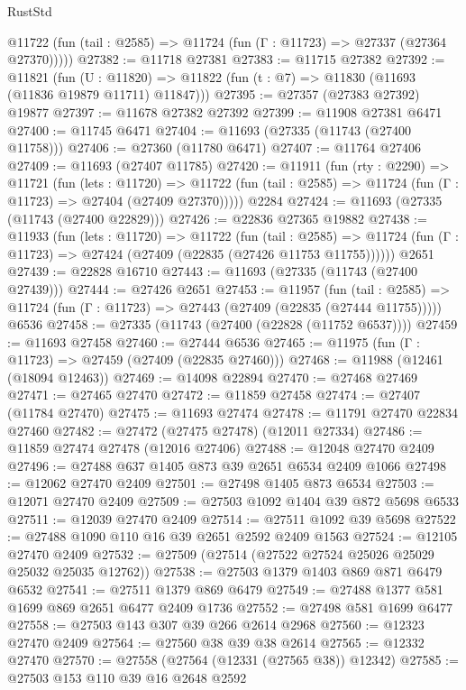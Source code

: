 \begin{lexlean}{RustStd}
\begin{coremodule}
      @11722 (fun (tail : @2585) => @11724 (fun (Γ : @11723) => @27337 (@27364 @27370)))))
@27382 := @11718 @27381
@27383 := @11715 @27382
@27392 := @11821
    (fun (U : @11820) => @11822 (fun (t : @7) => @11830 (@11693 (@11836 @19879 @11711) @11847)))
@27395 := @27357 (@27383 @27392) @19877
@27397 := @11678 @27382 @27392
@27399 := @11908 @27381 @6471
@27400 := @11745 @6471
@27404 := @11693 (@27335 (@11743 (@27400 @11758)))
@27406 := @27360 (@11780 @6471)
@27407 := @11764 @27406
@27409 := @11693 (@27407 @11785)
@27420 := @11911
    (fun (rty : @2290) =>
    @11721
      (fun (lets : @11720) =>
      @11722 (fun (tail : @2585) => @11724 (fun (Γ : @11723) => @27404 (@27409 @27370)))))
    @2284
@27424 := @11693 (@27335 (@11743 (@27400 @22829)))
@27426 := @22836 @27365 @19882
@27438 := @11933
    (fun (lets : @11720) =>
    @11722
      (fun (tail : @2585) =>
      @11724 (fun (Γ : @11723) => @27424 (@27409 (@22835 (@27426 @11753 @11755))))))
    @2651
@27439 := @22828 @16710
@27443 := @11693 (@27335 (@11743 (@27400 @27439)))
@27444 := @27426 @2651
@27453 := @11957
    (fun (tail : @2585) => @11724 (fun (Γ : @11723) => @27443 (@27409 (@22835 (@27444 @11755)))))
    @6536
@27458 := @27335 (@11743 (@27400 (@22828 (@11752 @6537))))
@27459 := @11693 @27458
@27460 := @27444 @6536
@27465 := @11975 (fun (Γ : @11723) => @27459 (@27409 (@22835 @27460)))
@27468 := @11988 (@12461 (@18094 @12463))
@27469 := @14098 @22894
@27470 := @27468 @27469
@27471 := @27465 @27470
@27472 := @11859 @27458
@27474 := @27407 (@11784 @27470)
@27475 := @11693 @27474
@27478 := @11791 @27470 @22834 @27460
@27482 := @27472 (@27475 @27478) (@12011 @27334)
@27486 := @11859 @27474 @27478 (@12016 @27406)
@27488 := @12048 @27470 @2409
@27496 := @27488 @637 @1405 @873 @39 @2651 @6534 @2409 @1066
@27498 := @12062 @27470 @2409
@27501 := @27498 @1405 @873 @6534
@27503 := @12071 @27470 @2409
@27509 := @27503 @1092 @1404 @39 @872 @5698 @6533
@27511 := @12039 @27470 @2409
@27514 := @27511 @1092 @39 @5698
@27522 := @27488 @1090 @110 @16 @39 @2651 @2592 @2409 @1563
@27524 := @12105 @27470 @2409
@27532 := @27509 (@27514 (@27522 @27524 @25026 @25029 @25032 @25035 @12762))
@27538 := @27503 @1379 @1403 @869 @871 @6479 @6532
@27541 := @27511 @1379 @869 @6479
@27549 := @27488 @1377 @581 @1699 @869 @2651 @6477 @2409 @1736
@27552 := @27498 @581 @1699 @6477
@27558 := @27503 @143 @307 @39 @266 @2614 @2968
@27560 := @12323 @27470 @2409
@27564 := @27560 @38 @39 @38 @2614
@27565 := @12332 @27470
@27570 := @27558 (@27564 (@12331 (@27565 @38)) @12342)
@27585 := @27503
    @153
    @110
    @39
    @16
    @2648
    @2592

\end{coremodule}
\end{lexlean}
